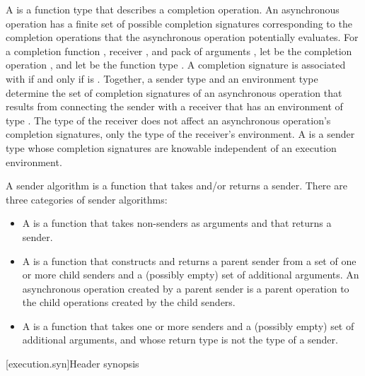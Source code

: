 \pnum
A  is a function type
that describes a completion operation.
An asynchronous operation has a finite set of possible completion signatures
corresponding to the completion operations
that the asynchronous operation potentially evaluates.
For a completion function ,
receiver , and
pack of arguments ,
let  be the completion operation , and
let  be
the function type .
A completion signature  is associated with 
if and only if
 is .
Together, a sender type and an environment type  determine
the set of completion signatures of an asynchronous operation
that results from connecting the sender with a receiver
that has an environment of type .
The type of the receiver does not affect
an asynchronous operation's completion signatures,
only the type of the receiver's environment.
A  is a sender type
whose completion signatures are knowable
independent of an execution environment.

\pnum
A sender algorithm is a function that takes and/or returns a sender.
There are three categories of sender algorithms:
\begin{itemize}
\item
A  is a function
that takes non-senders as arguments and that returns a sender.
\item
A  is a function
that constructs and returns a parent sender
from a set of one or more child senders and
a (possibly empty) set of additional arguments.
An asynchronous operation created by a parent sender is
a parent operation to the child operations created by the child senders.
\item
A  is a function
that takes one or more senders and
a (possibly empty) set of additional arguments, and
whose return type is not the type of a sender.
\end{itemize}

[execution.syn]{Header  synopsis}

